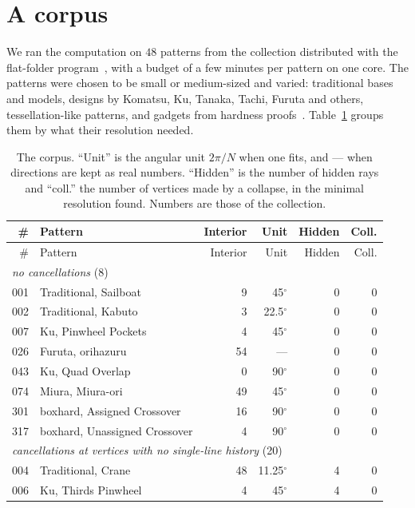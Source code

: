 \documentclass[11pt]{article}
\theoremstyle{definition}
\theoremstyle{remark}
\begin{document}
\section{A corpus}\label{sec:corpus}

We ran the computation on $48$ patterns from the collection distributed with the flat-folder program~\cite{flatfolder}, with a budget of a few minutes per pattern on one core. The patterns were chosen to be small or medium-sized and varied: traditional bases and models, designs by Komatsu, Ku, Tanaka, Tachi, Furuta and others, tessellation-like patterns, and gadgets from hardness proofs~\cite{bernhayes,boxhard}. Table~\ref{tab:corpus} groups them by what their resolution needed.

{\small
\begin{longtable}{rl r r r r}
\caption{The corpus. ``Unit'' is the angular unit $2\pi/N$ when one fits, and --- when directions are kept as real numbers. ``Hidden'' is the number of hidden rays and ``coll.'' the number of vertices made by a collapse, in the minimal resolution found. Numbers are those of the collection.}\label{tab:corpus}\\
\toprule
\# & Pattern & Interior & Unit & Hidden & Coll.\\
\endfirsthead
\toprule
\# & Pattern & Interior & Unit & Hidden & Coll.\\
\endhead
\midrule\multicolumn{6}{l}{\emph{no cancellations} (8)}\\
001 & Traditional, Sailboat & 9 & 45$^\circ$ & 0 & 0 \\
002 & Traditional, Kabuto & 3 & 22.5$^\circ$ & 0 & 0 \\
007 & Ku, Pinwheel Pockets & 4 & 45$^\circ$ & 0 & 0 \\
026 & Furuta, orihazuru & 54 & --- & 0 & 0 \\
043 & Ku, Quad Overlap & 0 & 90$^\circ$ & 0 & 0 \\
074 & Miura, Miura-ori & 49 & 45$^\circ$ & 0 & 0 \\
301 & boxhard, Assigned Crossover & 16 & 90$^\circ$ & 0 & 0 \\
317 & boxhard, Unassigned Crossover & 4 & 90$^\circ$ & 0 & 0 \\
\midrule\multicolumn{6}{l}{\emph{cancellations at vertices with no single-line history} (20)}\\
004 & Traditional, Crane & 48 & 11.25$^\circ$ & 4 & 0 \\
006 & Ku, Thirds Pinwheel & 4 & 45$^\circ$ & 4 & 0 \\

\end{longtable}}
\end{document}
